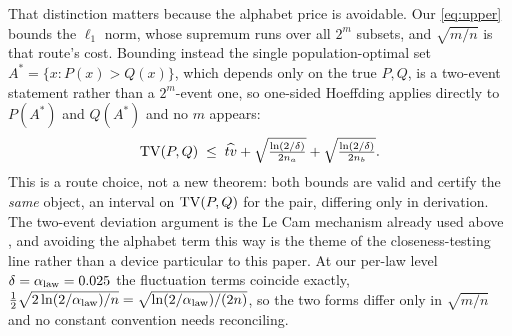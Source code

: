 That distinction matters because the alphabet price is avoidable. Our
\eqref{eq:upper} bounds the $\ell_1$ norm, whose supremum runs over all $2^m$
subsets, and $\sqrt{m/n}$ is that route's cost. Bounding instead the single
population-optimal set $A^\ast=\{x:P(x)>Q(x)\}$, which depends only on the true
$P,Q$, is a two-event statement rather than a $2^m$-event one, so one-sided
Hoeffding applies directly to $P(A^\ast)$ and $Q(A^\ast)$ and no $m$ appears:
\begin{equation}
  \mathrm{TV}(P,Q) \;\le\; \widehat{tv}
  + \sqrt{\tfrac{\ln(2/\delta)}{2n_a}} + \sqrt{\tfrac{\ln(2/\delta)}{2n_b}} .
  \label{eq:mfree}
\end{equation}
This is a route choice, not a new theorem: both bounds are valid and certify
the \emph{same} object, an interval on $\mathrm{TV}(P,Q)$ for the pair, differing only in
derivation. The two-event deviation argument is the Le Cam mechanism already
used above \citep{tsybakov2009introduction}, and avoiding the alphabet term this
way is the theme of the closeness-testing line
\citep{chan2013closeness,diakonikolas2020highprob} rather than a device particular
to this paper. At our per-law level $\delta=\alpha_{\mathrm{law}}=0.025$ the fluctuation terms
coincide exactly, $\tfrac12\sqrt{2\ln(2/\alpha_{\mathrm{law}})/n}=\sqrt{\ln(2/\alpha_{\mathrm{law}})/(2n)}$, so
the two forms differ only in $\sqrt{m/n}$ and no constant convention needs
reconciling.

